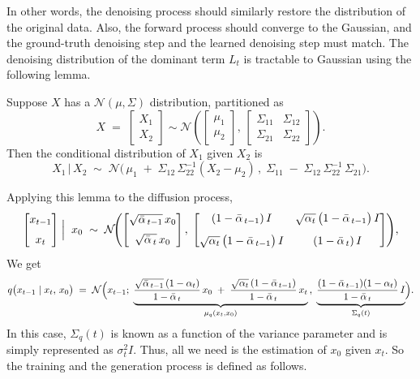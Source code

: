 In other words, the denoising process should similarly restore the distribution of the original data. Also, the forward process should converge to the Gaussian, and the ground-truth denoising step and the learned denoising step must match.
The denoising distribution of the dominant term $L_t$ is tractable to Gaussian using the following lemma.
\begin{lemma}
Suppose \(X\) has a \(\mathcal{N}(\mu,\Sigma)\) distribution, partitioned as
\[
X \;=\; \begin{bmatrix} X_{1} \\ X_{2} \end{bmatrix}\sim\mathcal{N}\left(\begin{bmatrix} \mu_{1} \\ \mu_{2} \end{bmatrix},\,
\begin{bmatrix}
\Sigma_{11} & \Sigma_{12} \\
\Sigma_{21} & \Sigma_{22}
\end{bmatrix}\right).
\]
Then the conditional distribution of \(X_{1}\) given \(X_{2}\) is
\[
X_{1} \,|\, X_{2}
\;\sim\;
\mathcal{N}\!\bigl(\,\mu_{1} \;+\; \Sigma_{12}\,\Sigma_{22}^{-1}(X_{2} - \mu_{2})\,,\;
\Sigma_{11} \;-\; \Sigma_{12}\,\Sigma_{22}^{-1}\,\Sigma_{21}\bigr).
\]
\end{lemma}
\noindent Applying this lemma to the diffusion process,
\[
\begin{bmatrix}
x_{t-1} \\[6pt]
x_{t}
\end{bmatrix}
\Bigm|\;x_{0}
\;\sim\;
\mathcal{N}\!\Biggl(
\begin{bmatrix}
\sqrt{\bar\alpha_{\,t-1}}\,x_{0} \\[6pt]
\sqrt{\bar\alpha_{\,t}}\,x_{0}
\end{bmatrix}
,
\;
\begin{bmatrix}
(1 - \bar\alpha_{\,t-1})\,I 
& \sqrt{\alpha_{t}}\,\bigl(1 - \bar\alpha_{\,t-1}\bigr)\,I \\[8pt]
\sqrt{\alpha_{t}}\,\bigl(1 - \bar\alpha_{\,t-1}\bigr)\,I 
& (1 - \bar\alpha_{\,t})\,I
\end{bmatrix}
\Biggr),
\]
We get 
\[
q\bigl(x_{t-1} \mid x_{t},\,x_{0}\bigr)
\;=\;
\mathcal{N}\Bigl(
x_{t-1};\;
\underbrace{\frac{\sqrt{\bar\alpha_{\,t-1}}\,(1 - \alpha_{t})}{\,1 - \bar\alpha_{\,t}\,}\,x_{0}
 \;+\;
 \frac{\sqrt{\alpha_{t}}\,(1 - \bar\alpha_{\,t-1})}{\,1 - \bar\alpha_{\,t}\,}\,x_{t}}_{\mu_q(x_{t}, x_{0})}\,,\;
\underbrace{\frac{(1 - \bar\alpha_{\,t-1})(1 - \alpha_{t})}{\,1 - \bar\alpha_{\,t}\,}\,I}_{\Sigma_q(t)}
\Bigr).
\]
In this case, $\Sigma_q(t)$ is known as a function of the variance parameter and is simply represented as $\sigma^2_tI$. Thus, all we need is the estimation of $x_0$ given $x_t$. So the training and the generation process is defined as follows.
